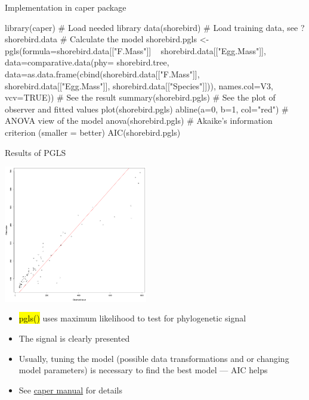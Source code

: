\documentclass[compress, ucs, xelatex, 11pt, xcolor=svgnames,
  hyperref={
    bookmarks=true,
    unicode=true,
    colorlinks=true,
    pdftitle={Molecular data in R},
    plainpages=false,
    pdfauthor={Vojtech Zeisek},
    pdfsubject={Course about phylogeny and evolution in R},
    pdfcreator={XeLaTeX},
    pdfkeywords={R, evolution, phylogeny, molecular data},
    linkcolor=Tomato,
    anchorcolor=SaddleBrown,
    citecolor=Goldenrod,
    filecolor=DarkMagenta,
    menucolor=Sienna,
    urlcolor=DarkTurquoise,
    pdftex},
  url={hyphens, lowtilde} %
  ]{beamer}
\renewcommand{\texttt}[1]{\hl{\ttfamily #1}}
\begin{document}
\begin{frame}[fragile]{Implementation in caper package}
  \begin{spluscode}
    library(caper) # Load needed library
    data(shorebird) # Load training data, see ?shorebird.data
    # Calculate the model
    shorebird.pgls <- pgls(formula=shorebird.data[["F.Mass"]] ~
      shorebird.data[["Egg.Mass"]], data=comparative.data(phy=
      shorebird.tree, data=as.data.frame(cbind(shorebird.data[["F.Mass"]],
      shorebird.data[["Egg.Mass"]], shorebird.data[["Species"]])),
      names.col=V3, vcv=TRUE))
    # See the result
    summary(shorebird.pgls)
    # See the plot of observer and fitted values
    plot(shorebird.pgls)
    abline(a=0, b=1, col="red")
    # ANOVA view of the model
    anova(shorebird.pgls)
    # Akaike's information criterion (smaller = better)
    AIC(shorebird.pgls)
  \end{spluscode}
\end{frame}

\begin{frame}[fragile]{Results of PGLS}
  \begin{multicols}{2}
    \includegraphics[height=6cm]{shorebirds.png}
    \begin{itemize}
      \item \texttt{pgls()} uses maximum likelihood to test for phylogenetic signal
      \item The signal is clearly presented
      \item Usually, tuning the model (possible data transformations and or changing model parameters) is necessary to find the best model --- AIC helps
      \item See \href{https://CRAN.R-project.org/package=caper}{caper manual} for details
    \end{itemize}
  \end{multicols}
\end{frame}
\end{document}
